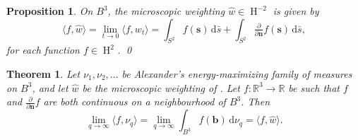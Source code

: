 \documentclass[10pt,a4paper]{amsart}
\newtheorem{prop}{Proposition}
\newtheorem{theorem}{Theorem}
\newcommand{\R}{\mathbb{R}}
\DeclareMathOperator{\besselspace}{H}
\newcommand{\dd}{\mathrm{d}} %
\newcommand{\dispair}[2]{\langle #2,#1 \rangle}
\renewcommand{\vec}{\mathbf}
\begin{document}
\begin{prop}
\label{prop:microwtg-on-B3}
On \(B^3\), the microscopic weighting  \(\widehat{w} \in \besselspace^{-2}\) is given by
\[
    \dispair{\widehat{w}}{f}
    =
    \lim_{t \to 0}
    \dispair{w_t}{f}
    =
    \int_{S^2} f(\vec{s}) \,\dd \bar{s}
    +
    \int_{S^2} \tfrac{\partial}{\partial \vec{n}} f(\vec{s}) \,\dd \bar{s},
\]
for each function \(f \in \besselspace^2\). 
\qed
\end{prop}

\begin{theorem}
\label{thm:alexander_limit}
    Let \(\nu_1, \nu_2, \dots\) be Alexander's energy-maximizing family of measures on \(B^3\), and let  \(\widehat{w}\) be the microscopic weighting of . Let \(f \colon \R^3 \to \R\) be such that \(f\) and \(\tfrac{\partial}{\partial \vec{n}} f\) are both continuous on a neighbourhood of \(B^3\). Then
    \[
        \lim_{q \to \infty} \dispair{\nu_q}{f} = \lim_{q\to \infty} 
        \int_{B^3} f(\vec{b})  \,\dd \nu_q 
        =
        \dispair{\widehat{w}}{f}.
    \]
\end{theorem}
\end{document}

